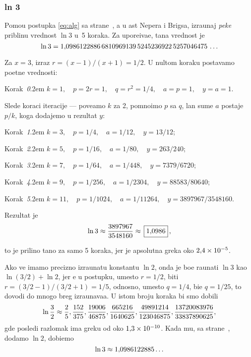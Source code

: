 \subsubsection{ln 3}\label{sssec:ln3}
 
\zadatak
Pomo{\cc}u postupka \eqref{eq:alg} sa 
strane~\pageref{eq:alg}, a u {\cv}ast Nepera i Brigsa,
izra{\cv}unaj {\sl pe{\sv}ke\/} pribli{\zv}nu vrednost $\ln 3$
u~5 koraka. Za upore{\dj}iva{\nj}e, ta{\cv}na vrednost je
$$
\ln3=1\.
0986122886\,
6810969139\,
5245236922\,
5257046475\,\ldots
$$

\def\step#1{\par\smallskip\indent\leavevmode
  Korak~{\it#1}.\kern2em\relax}

\resenje
Za $x=3$, izraz $r=(x-1)/(x+1)=1/2$. U nultom koraku postav{\lj}amo po{\cv}etne vrednosti:
\step0 $k=1,\quad p=2r=1,\quad q=r^2=1/4,\quad a=p=1,\quad y=a=1$.

\smallskip
\noindent Slede koraci iteracije --- pove{\cc}amo $k$ za 2, pomno{\zv}imo $p$ sa $q$,
{\cv}lan sume $a$ postaje $p/k$, koga dodajemo u rezultat $y$:

\step1 $k=3,\quad p=1/4,\quad a=1/12,\quad y=13/12$;
\step2 $k=5,\quad p=1/16,\quad a=1/80,\quad y=263/240$;
\step3 $k=7,\quad p=1/64,\quad a=1/448,\quad y=7379/6720$;
\step4 $k=9,\quad p=1/256,\quad a=1/2304,\quad y=88583/80640$;
\step5 $k=11,\quad p=1/1024,\quad a=1/11264,\quad y=3897967/3548160$.

\medskip
\noindent Rezultat je
$$
\ln3\approx{3897967\over3548160}\approx \ram{1\.0986},
$$

\smallskip\noindent
{\sv}to je prili{\cv}no ta{\cv}no za samo 5 koraka, jer je apsolutna gre{\sv}ka oko $2\.4\puta10^{-5}$.

\iffalse
Da smo ra{\cv}unali u 20 koraka, 
dobili bi smo $\ln3\approx\frac{636083906982236368109838473}{578988523561291667944243200}$, 
gre{\sv}ka bi bila oko $7\puta10^{-15}$, {\sv}to je preciznost s kojom je 1617.\ godine Brigs
izra{\cv}unao svoje prve logaritamske tablice.
\fi

\dodatak
Ako ve{\cc} imamo precizno izra{\cv}unatu konstantu $\ln2$, onda je bo{\lj}e ra{\cv}unati $\ln3$ kao $\ln(3/2)+\ln2$,
jer {\cc}e u postupku, umesto $r=1/2$, biti $r=(3/2-1)/(3/2+1)=1/5$, 
odnosno, umesto $q=1/4$, bi{\cc}e $q=1/25$,
{\sv}to dovodi do mnogo br{\zv}eg izra{\cv}unava{\nj}a. U istom broju koraka bi smo dobili
$$
\ln\frac32\approx
\ff2/5, \ff152/375, \ff19006/46875, \ff665216/1640625, \ff49891214/123046875, 
\ff13720083976/33837890625,
$$
gde posled{\nj}i razlomak ima gre{\sv}ku od oko $1\.3\puta10^{-10}$.
Kada mu, sa strane~\pageref{ln2}, dodamo $\ln2$, dobi{\cc}emo
$$\ln3\approx1\.0986122885\ldots$$

